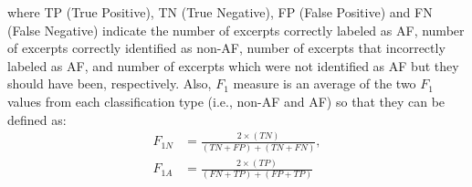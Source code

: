 \documentclass[conference]{IEEEtran}
\begin{document}
where TP (True Positive), TN (True Negative), FP (False Positive) and FN (False Negative) indicate the number of excerpts correctly labeled as AF, number of excerpts correctly identified as non-AF, number of excerpts that incorrectly labeled as AF, and number of excerpts which were not identified as AF but they should have been, respectively. Also, $F_1$ measure is an average of the two $F_1$ values from each classification type (i.e., non-AF and AF) so that they can be defined as:
\begin{align*}
F_{1N} &= \frac{2\times(TN)}{(TN+FP)+(TN+FN)}, \\
F_{1A} &= \frac{2\times(TP)}{(FN+TP)+(FP+TP)}
\end{align*}

\begin{table*} [htb] 
\caption{Comparison of performance of the proposed model against other algorithms on the MIT-BIH AFIB database with the ECG segment of size 5-s ($\leq$ 7 Beats).}
\end{table*}
\end{document}
